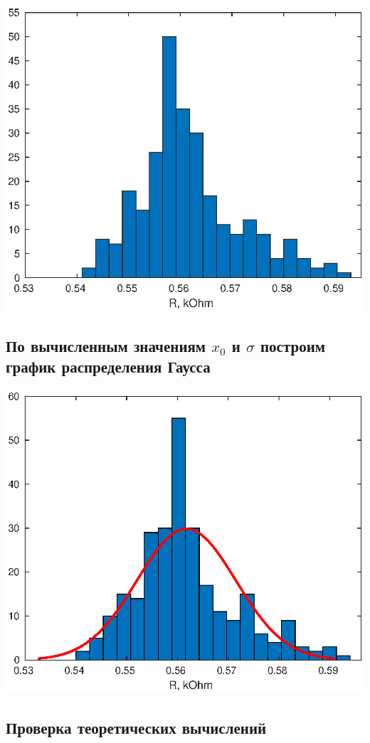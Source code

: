 \documentclass[a4paper, 12pt]{article}
\begin{document}
\includegraphics[scale = 0.7]{hist.eps}

\subsection{По вычисленным значениям $x_0$ и $\sigma$ построим график распределения Гаусса}

\includegraphics[scale = 0.7]{gauss.eps}

\subsection{Проверка теоретических вычислений}
\end{document}
